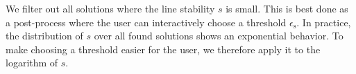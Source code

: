 %
We filter out all solutions where the line stability $s$ is small.
%
This is best done as a post-process where the user can interactively choose
a threshold $\epsilon_{\mathrm{s}}$.
%
In practice, the distribution of $s$ over all found solutions shows an
exponential behavior.
%
To make choosing a threshold easier for the user, we therefore apply it to the
logarithm of $s$.
%
%
